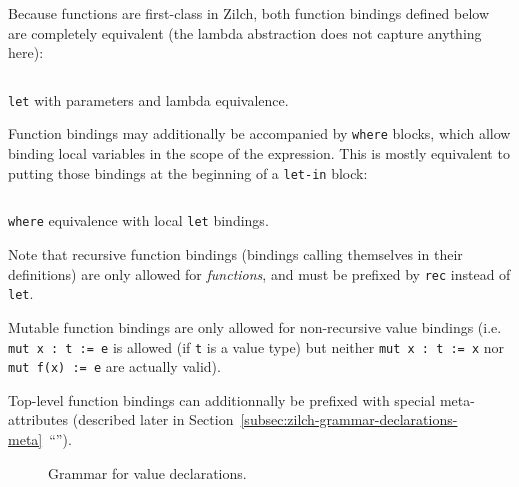 Because functions are first-class in Zilch, both function bindings defined below are completely equivalent (the lambda abstraction does not capture anything here):

\begin{listing}[H]
	\inputminted{\zilchlexer}{examples/function-value-equivalence.zc}

	\captionsetup{style=invisible}
	\caption{\texttt{let} with parameters and lambda equivalence.}
\end{listing}
\vspace*{-\baselineskip}

Function bindings may additionally be accompanied by \verb|where| blocks, which allow binding local variables in the scope of the expression.
This is mostly equivalent to putting those bindings at the beginning of a \verb|let-in| block:

\begin{listing}[H]
	\inputminted{\zilchlexer}{examples/function-where-let-equivalence.zc}

	\captionsetup{style=invisible}
	\caption{\texttt{where} equivalence with local \texttt{let} bindings.}
\end{listing}
\vspace*{-\baselineskip}

Note that recursive function bindings (bindings calling themselves in their definitions) are only allowed for \textit{functions}, and must be prefixed by \verb|rec| instead of \verb|let|.

Mutable function bindings are only allowed for non-recursive value bindings (i.e. \texttt{mut x : t := e} is allowed (if \verb|t| is a value type) but neither \texttt{mut x : t := x} nor \texttt{mut f(x) := e} are actually valid).

Top-level function bindings can additionnally be prefixed with special meta-attributes (described later in Section~\ref{subsec:zilch-grammar-declarations-meta}~``'').

\begin{figure}[H]
	\centering


	\caption{Grammar for value declarations.}
	\label{fig:zilch-grammar-declarations-value-grammar}
\end{figure}

